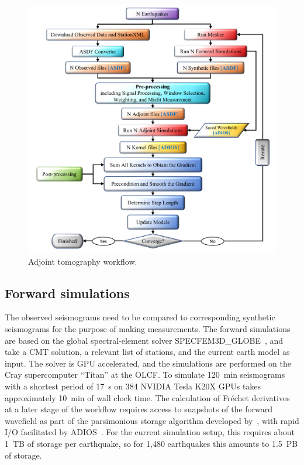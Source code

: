 \documentclass[extra,mreferee]{gji}
\begin{document}
\begin{figure}
  \centering
  \includegraphics[width=\textwidth]{figures/adjoint_workflow_6.pdf}
  \caption{Adjoint tomography workflow.}
  \label{fig:adjoint_workflow}
\end{figure}

\subsection{Forward simulations}

The observed seismograms need to be compared to corresponding synthetic seismograms
for the purpose of making measurements.
The forward simulations are based on the global spectral-element solver
SPECFEM3D\_GLOBE~\citep{KoTr02a,KoTr02a}, and take a CMT solution, a relevant list
of stations, and the current earth model as input.
The solver is GPU accelerated, and the simulations are performed on the Cray supercomputer ``Titan''
at the OLCF.
To simulate 120~min seismograms with a shortest period of 17~s on 384 NVIDIA
Tesla K20X GPUs takes approximately 10~min of wall clock time.
The calculation of Fr\'echet derivatives at a later stage of the workflow requires
access to snapshots of the forward wavefield as part of the parsimonious storage
algorithm developed by~\cite{KoXiBoPeSaLiTr16},
with rapid I/O facilitated by ADIOS~\citep{liu2014hello}.
For the current simulation setup,
this requires about 1~TB of storage per earthquake,
so for 1,480 earthquakes this amounts to 1.5~PB of storage.
\end{document}
